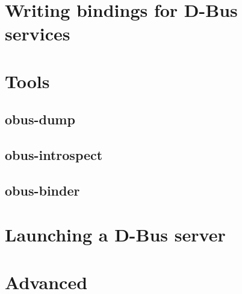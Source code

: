 \documentclass{article}
\begin{document}
\section{Writing bindings for D-Bus services}


\section{Tools}

\subsection{obus-dump}
\subsection{obus-introspect}
\subsection{obus-binder}

\section{Launching a D-Bus server}


\section{Advanced}




\end{document}

